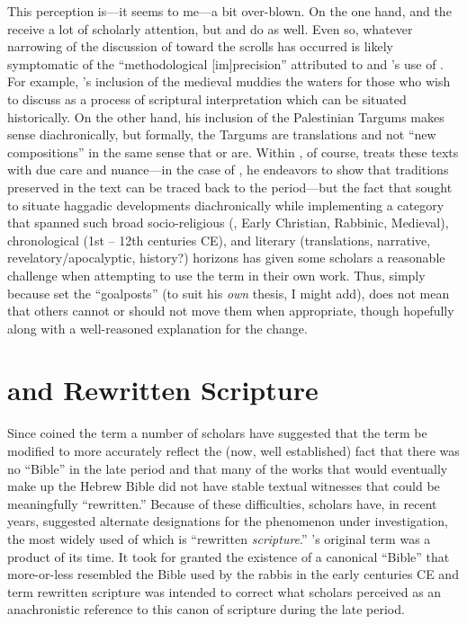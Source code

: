 This perception is---it seems to me---a bit over-blown. On the one hand, \ga and the \templescroll receive a lot of scholarly attention, but \jub and \ant do as well. Even so, whatever narrowing of the discussion of \rwb toward the \qumran scrolls has occurred is likely symptomatic of the ``methodological {[}im{]}precision'' attributed to  and \vermes's use of \rwB. For example, \vermes's inclusion of the medieval \sefer muddies the waters for those who wish to discuss \rwb as a process of scriptural interpretation which can be situated historically. On the other hand, his inclusion of the Palestinian Targums makes sense diachronically, but formally, the Targums are translations and not ``new compositions'' in the same sense that \jub or \ga are. Within , of course, \vermes treats these texts with due care and nuance---in the case of \sefer, he endeavors to show that traditions preserved in the text can be traced back to the \secondtemple period---but the fact that \vermes sought to situate haggadic developments diachronically while implementing a category that spanned such broad socio-religious (\qumran, Early Christian, Rabbinic, Medieval), chronological (1st -- 12th centuries CE), and literary (translations, narrative, revelatory/apocalyptic, history?) horizons has given some scholars a reasonable challenge when attempting to use the term in their own work. Thus, simply because \vermes set the ``goalposts'' (to suit his \emph{own} thesis, I might add), does not mean that others cannot or should not move them when appropriate, though hopefully along with a well-reasoned explanation for the change. 

\section{\RWB and Rewritten Scripture}

Since \vermes coined the term \rwb a number of scholars have suggested that the term be modified to more accurately reflect the (now, well established) fact that there was no ``Bible'' in the late \secondtemple period and that many of the works that would eventually make up the Hebrew Bible did not have stable textual witnesses that could be meaningfully ``rewritten.'' Because of these difficulties, scholars have, in recent years, suggested alternate designations for the phenomenon under investigation, the most widely used of which is ``rewritten \emph{scripture}.'' \vermes's original term \rwb was a product of its time. It took for granted the existence of a canonical ``Bible'' that more-or-less resembled the Bible used by the rabbis in the early centuries CE and term rewritten scripture was intended to correct what scholars perceived as an anachronistic reference to this canon of scripture during the late \secondtemple period.\autocites[58--59]{campbell_zsengeller2014}[See also][]{ulrich_mcdonald-sanders2002}[and][]{ulrich_zsengeller2014} 

